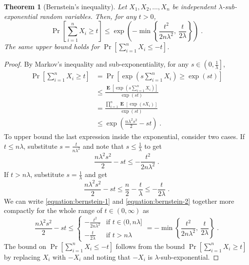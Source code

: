 \documentclass[12pt]{article}
\newtheorem{theorem}[definition]{Theorem}
\DeclareMathOperator*{\Exp}{\mathbf{E}}
\begin{document}
\begin{theorem}[Bernstein's inequality]
\label{theorem:bernstein-inequality}
Let $X_1, X_2, \dots, X_n$ be independent $\lambda$-sub-exponential
random variables. Then, for any $t > 0$,
$$
\Pr\left[ \sum_{i=1}^n X_i \ge t \right]
\le
\exp\left( - \min \left\{ \frac{t^2}{2n\lambda^2}, \ \frac{t}{2\lambda} \right\} \right) \; .
$$
The same upper bound holds for $\Pr[\sum_{i=1}^n X_i \le - t]$.
\end{theorem}

\begin{proof}
By Markov's inequality and sub-exponentiality, for any $s \in \left(0, \frac{1}{\lambda} \right]$,
\begin{align*}
\Pr\left[ \sum_{i=1}^n X_i \ge t \right]
& = \Pr\left[ \exp\left(s \sum_{i=1}^n X_i \right) \ge \exp(st) \right] \\
& \le \frac{\Exp \left[ \exp(s \sum_{i=1}^n X_i) \right]}{\exp(st)} \\
& = \frac{\prod_{i=1}^n \Exp \left[ \exp(s X_i) \right]}{\exp(st)} \\
& \le \exp\left( \frac{n \lambda^2 s^2}{2} - st \right) \; .
\end{align*}
To upper bound the last expression inside the exponential, consider two cases.
If $t \le n \lambda$, substitute $s = \frac{t}{n\lambda^2}$ and note that $s \le \frac{1}{\lambda}$
to get
\begin{equation}
\label{equation:bernstein-1}
\frac{n \lambda^2 s^2}{2} - st \le - \frac{t^2}{2n\lambda^2} \; .
\end{equation}
If $t > n \lambda$, substitute $s=\frac{1}{\lambda}$ and get
\begin{equation}
\label{equation:bernstein-2}
\frac{n \lambda^2 s^2}{2} - st \le \frac{n}{2} - \frac{t}{\lambda} \le - \frac{t}{2\lambda} \; .
\end{equation}
We can write \eqref{equation:bernstein-1} and \eqref{equation:bernstein-2}
together more compactly for the whole range of $t \in (0, \infty)$ as
$$
\frac{n \lambda^2 s^2}{2} - st
\le
\begin{cases}
- \frac{t^2}{2n\lambda^2} & \text{if $t \in (0, n\lambda] $} \\
- \frac{t}{2\lambda} & \text{if $t > n \lambda$}
\end{cases}
= - \min \left\{ \frac{t^2}{2n\lambda^2}, \ \frac{t}{2\lambda} \right\} \; .
$$
The bound on $\Pr[\sum_{i=1}^n X_i \le - t]$ follows from the bound
$\Pr\left[ \sum_{i=1}^n X_i \ge t \right]$ by replacing $X_i$ with $-X_i$
and noting that $-X_i$ is $\lambda$-sub-exponential.
\end{proof}
\end{document}

